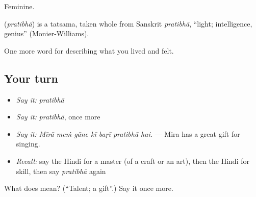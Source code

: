 Feminine.

\begin{cousinweb}
\textbf{} (\emph{pratibhā}) is a tatsama, taken whole from Sanskrit \emph{pratibhā}, \textquotedblleft{}light; intelligence, genius\textquotedblright{} (Monier-Williams).
\end{cousinweb}

\begin{grammarlens}[title={What you've built}]
One more word for describing what you lived and felt.
\end{grammarlens}

\subsection*{Your turn}
\begin{itemize}
\raggedright
  \item \emph{Say it:} \emph{pratibhā}
  \item \emph{Say it:} \emph{pratibhā}, once more
  \item \emph{Say it:} \emph{Mīrā meṁ gāne kī baṛī pratibhā hai.} — Mira has a great gift for singing.
  \item \emph{Recall:} say the Hindi for a master (of a craft or an art), then the Hindi for skill, then say \emph{pratibhā} again
\end{itemize}

\begin{tcolorbox}[breakable,colback=teal!4,colframe=teal!35!black,title={Before you move on}]
What does  mean? (\textquotedblleft{}Talent; a gift\textquotedblright{}.) Say it once more.
\end{tcolorbox}
